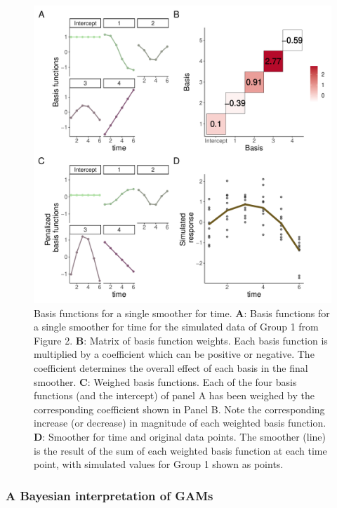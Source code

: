 \documentclass[
]{article}
\begin{document}
\begin{figure}

{\centering \includegraphics[width=0.75\linewidth]{Full_document_SIM_No_Appendix_files/figure-latex/basis-plot-1} 

}

\caption{Basis functions for a single smoother for time. \textbf{A}: Basis functions for a single smoother for time for the simulated data of Group 1 from Figure 2. \textbf{B}: Matrix of basis function weights. Each basis function is multiplied by a coefficient which can be positive or negative. The coefficient determines the overall effect of each basis in the final smoother. \textbf{C}: Weighed basis functions. Each of the four basis functions (and the intercept) of panel A has been weighed by the corresponding coefficient shown in Panel B. Note the corresponding increase (or decrease) in magnitude of each weighted basis function. \textbf{D}: Smoother for time and original data points. The smoother (line) is the result of the sum of each weighted basis function at each time point, with simulated values for Group 1 shown as points.}\label{fig:basis-plot}
\end{figure}

\hypertarget{a-bayesian-interpretation-of-gams}{%
\subsubsection{A Bayesian interpretation of GAMs}\label{a-bayesian-interpretation-of-gams}}
\end{document}
